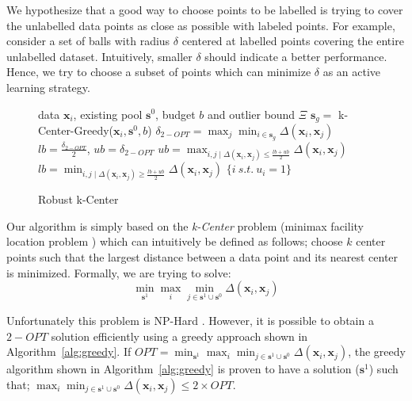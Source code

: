 \documentclass{article}
\begin{document}
We hypothesize that a good way to choose points to be labelled is trying to cover the unlabelled data points as close as possible with labeled points. For example, consider a set of balls with radius $\delta$ centered at labelled points covering the entire unlabelled dataset. Intuitively, smaller $\delta$ should indicate a better performance. Hence, we try to choose a subset of points which can minimize $\delta$ as an active learning strategy. 
  
    \begin{figure}
    \begin{minipage}{0.5\textwidth}
    \vspace{-8mm}
\begin{algorithm}[H]
   \caption{Robust k-Center}
   \label{alg:bin}
\begin{algorithmic}
    data $\mathbf{x}_i$, existing pool $\mathbf{s}^0$, budget $b$ and outlier bound $\Xi$
    $\mathbf{s}_g =$ k-Center-Greedy($\mathbf{x}_i, \mathbf{s}^0, b$)
   \STATE $\delta_{2-OPT} = \max_j \min_{i \in \mathbf{s}_g} \Delta(\mathbf{x}_i,\mathbf{x}_j)$ 
   \STATE $lb=\frac{\delta_{2-OPT}}{2}$, $ub=\delta_{2-OPT}$
   \REPEAT
   \STATE $ub=\max_{i,j \mid  \Delta(\mathbf{x}_i,\mathbf{x}_j) \leq \frac{lb+ub}{2}}  \Delta(\mathbf{x}_i,\mathbf{x}_j) $
   \ELSE
   \STATE $lb=\min_{i,j \mid   \Delta(\mathbf{x}_i,\mathbf{x}_j) \geq \frac{lb+ub}{2}}  \Delta(\mathbf{x}_i,\mathbf{x}_j) $
    \ENDIF
       $\{i\ s.t.\ u_i=1\}$
\end{algorithmic}
\end{algorithm}
\vspace{-5mm}
    \end{minipage}
  \end{figure}

Our algorithm is simply based on the \emph{k-Center} problem (minimax facility location problem \cite{facility}) which can intuitively be defined as follows; choose $k$ center points such that the largest distance between a data point and its nearest center is minimized. Formally, we are trying to solve:
\begin{equation}
\min_{\mathbf{s}^1} \max_i \min_{j \in \mathbf{s}^1 \cup \mathbf{s}^0} \Delta(\mathbf{x}_i,\mathbf{x}_j)
\end{equation}



Unfortunately this problem is NP-Hard \cite{cook}. However, it is possible to obtain a $2-OPT$ solution efficiently using a greedy approach shown in  Algorithm~\ref{alg:greedy}. If $OPT=\min_{\mathbf{s}^1} \max_i \min_{j \in \mathbf{s}^1 \cup \mathbf{s}^0} \Delta(\mathbf{x}_i,\mathbf{x}_j)$, the greedy algorithm shown in Algorithm~\ref{alg:greedy} is proven to have a solution ($\mathbf{s}^1$) such that; $ \max_i \min_{j \in \mathbf{s}^1 \cup \mathbf{s}^0} \Delta(\mathbf{x}_i,\mathbf{x}_j) \leq 2 \times OPT$.
\end{document}
